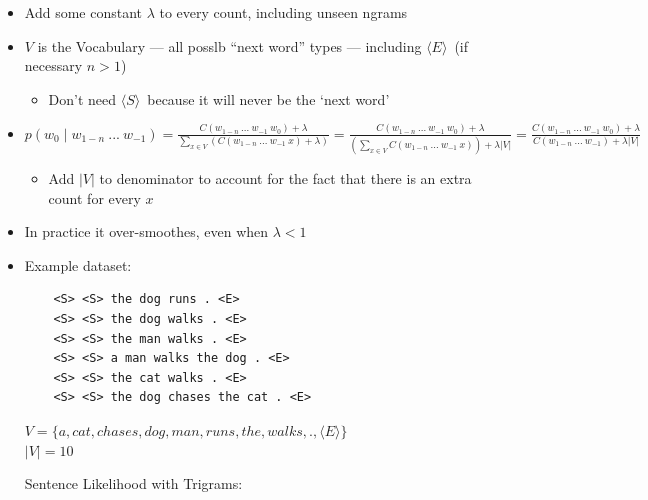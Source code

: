 \documentclass[11pt,letterpaper]{article}
\newcommand{\ngramstart}{\ensuremath{\langle S \rangle}}
\newcommand{\ngramend}{\ensuremath{\langle E \rangle}}
\begin{document}
\begin{itemize}
  \item Add some constant $\lambda$ to every count, including unseen ngrams
  \item $V$ is the Vocabulary --- all posslb ``next word'' types --- including \ngramend\ (if necessary $n>1$)
    \begin{itemize}
      \item Don't need \ngramstart\ because it will never be the `next word'
    \end{itemize}
  \item $p(w_0 \mid w_{1-n}~...~w_{-1}) = 
         \frac{C(w_{1-n}~...~w_{-1}~w_0)+\lambda}{\sum_{x \in V} (C(w_{1-n}~...~w_{-1}~x) + \lambda)} =
         \frac{C(w_{1-n}~...~w_{-1}~w_0)+\lambda}{(\sum_{x \in V} C(w_{1-n}~...~w_{-1}~x))+\lambda|V|} =
         \frac{C(w_{1-n}~...~w_{-1}~w_0)+\lambda}{C(w_{1-n}~...~w_{-1})+\lambda|V|}$
  \begin{itemize}
    \item Add $|V|$ to denominator to account for the fact that there is an extra count for every $x$
  \end{itemize}
  \item In practice it over-smoothes, even when $\lambda < 1$
  \item 
Example dataset:
\vspace{-2mm}
\begin{verbatim}
    <S> <S> the dog runs . <E>
    <S> <S> the dog walks . <E>
    <S> <S> the man walks . <E>
    <S> <S> a man walks the dog . <E>
    <S> <S> the cat walks . <E>
    <S> <S> the dog chases the cat . <E>
\end{verbatim}

$V = \{a, cat, chases, dog, man, runs, the, walks, ., \ngramend \}$\\
$|V| = 10$

Sentence Likelihood with Trigrams:


\end{itemize}
\end{document}

